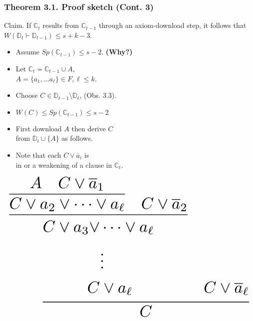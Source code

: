 \documentclass[t,usenames,dvipsnames]{beamer}
\begin{document}
\begin{frame}\frametitle{Theorem 3.1. Proof sketch (Cont. 3)}
	\begin{block}{Claim.}
		If $\mathbb{C}_t$ results from $\mathbb{C}_{t-1}$ through an axiom-download step, it
		follows that $W(\mathbb{D}_t \vdash \mathbb{D}_{t-1}) \leq s + k - 3$.
	\end{block}
	\pause
	\begin{minipage}[t]{0.6\linewidth}
	\begin{itemize}[<+->]
		\item Assume $Sp(\mathbb{C}_{t-1}) \leq s - 2$. \textbf{(Why?)}
		\item Let $\mathbb{C}_t = \mathbb{C}_{t-1} \cup A$,\\
			$A = \{a_1, \dots a_{\ell}\} \in F, \ell \leq k$.
		\item Choose $C \in \mathbb{D}_{t-1} \setminus \mathbb{D}_t$, (Obs. 3.3).
		\item[] $W(C) \leq Sp(\mathbb{C}_{t-1}) \leq s-2$ 
		\item First download $A$ then derive $C$\\
			from $\mathbb{D}_{t} \cup \{A\}$ as follows.
		\item Note that each $C \lor \overline a_i$ is\\
			in or a weakening of a clause in $\mathbb{C}_t$.
	\end{itemize}
	\end{minipage}%
	\hfill%
	\begin{minipage}[t]{0.39\linewidth}
		\pause
	$$
	\resizebox{\hsize}{!}{%
	\infer{C}{
		\infer{\begin{aligned}C \lor a_3 \lor& \dots \lor a_{\ell}\\ &\vdots\\ C &\lor
		a_{\ell} \end{aligned}}
		{
			\infer{C \lor a_2 \lor \dots \lor a_{\ell}}
			{A & C\lor \overline a_1}
		     	&C \lor \overline a_2
		}
	& \begin{aligned}\vphantom{A}\\ \vphantom{\vdots}\\ C \lor \overline
	a_{\ell}\end{aligned}}%
	}
	$$
	\end{minipage}
\end{frame}
\end{document}

